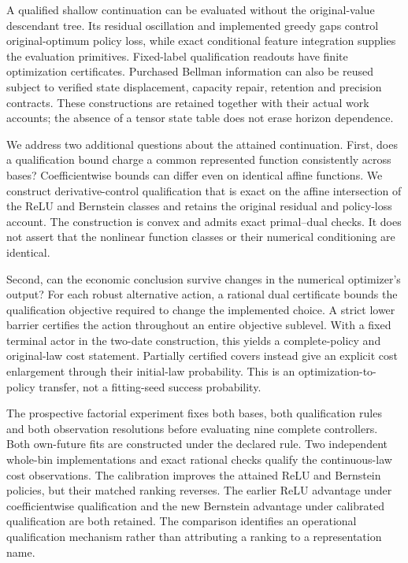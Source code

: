 \documentclass[ecta,nameyear,draft]{econsocart}
\begin{document}
A qualified shallow continuation can be evaluated without the original-value descendant tree. Its residual oscillation and implemented greedy gaps control original-optimum policy loss, while exact conditional feature integration supplies the evaluation primitives. Fixed-label qualification readouts have finite optimization certificates. Purchased Bellman information can also be reused subject to verified state displacement, capacity repair, retention and precision contracts. These constructions are retained together with their actual work accounts; the absence of a tensor state table does not erase horizon dependence.

We address two additional questions about the attained continuation. First, does a qualification bound charge a common represented function consistently across bases? Coefficientwise bounds can differ even on identical affine functions. We construct derivative-control qualification that is exact on the affine intersection of the ReLU and Bernstein classes and retains the original residual and policy-loss account. The construction is convex and admits exact primal--dual checks. It does not assert that the nonlinear function classes or their numerical conditioning are identical.

Second, can the economic conclusion survive changes in the numerical optimizer's output? For each robust alternative action, a rational dual certificate bounds the qualification objective required to change the implemented choice. A strict lower barrier certifies the action throughout an entire objective sublevel. With a fixed terminal actor in the two-date construction, this yields a complete-policy and original-law cost statement. Partially certified covers instead give an explicit cost enlargement through their initial-law probability. This is an optimization-to-policy transfer, not a fitting-seed success probability.

The prospective factorial experiment fixes both bases, both qualification rules and both observation resolutions before evaluating nine complete controllers. Both own-future fits are constructed under the declared rule. Two independent whole-bin implementations and exact rational checks qualify the continuous-law cost observations. The calibration improves the attained ReLU and Bernstein policies, but their matched ranking reverses. The earlier ReLU advantage under coefficientwise qualification and the new Bernstein advantage under calibrated qualification are both retained. The comparison identifies an operational qualification mechanism rather than attributing a ranking to a representation name.
\end{document}
